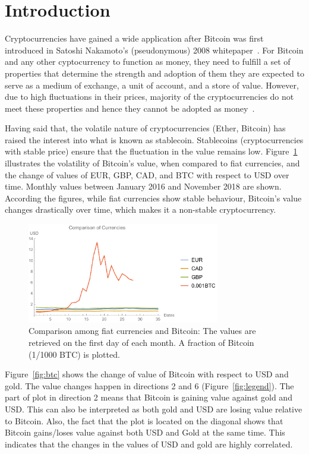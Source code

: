 \section{Introduction}\label{Intro}
Cryptocurrencies have gained a wide application after Bitcoin was first introduced in Satoshi Nakamoto’s (pseudonymous) 2008 whitepaper~\cite{nakamoto2008bitcoin}. For Bitcoin and any other cyptocurrency to function as money, they need to fulfill a set of properties that determine the strength and adoption of them \ie they are expected to serve as a medium of exchange, a unit of account, and a store of value. However, due to high fluctuations in their prices, majority of the cryptocurrencies do not meet these properties and hence they cannot be adopted as money~\cite{overview}.

Having said that, the volatile nature of cryptocurrencies (\eg Ether, Bitcoin) has raised the interest into what is known as stablecoin. Stablecoins (\ie cryptocurrencies with stable price) ensure that the fluctuation in the value remains low. Figure~\ref{fig:btcandfiat} illustrates the volatility of Bitcoin's value, when compared to fiat currencies, and the change of values of EUR, GBP, CAD, and BTC with respect to USD over time. Monthly values between January 2016 and November 2018 are shown. According the figures, while fiat currencies show stable behaviour, Bitcoin's value changes drastically over time, which makes it a non-stable cryptocurrency.

\begin{figure}[!htb]
	\centering
	\includegraphics[width=0.75\textwidth]{figures/graph1.pdf}
	\caption{\label{fig:btcandfiat}Comparison among fiat currencies and Bitcoin: The values are retrieved on the first day of each month. A fraction of Bitcoin (1/1000 BTC) is plotted.}
\end{figure}

Figure~\ref{fig:btc} shows the change of value of Bitcoin with respect to USD and gold. The value changes happen in directions 2 and 6 (Figure~\ref{fig:legend}). The part of plot in direction 2 means that Bitcoin is gaining value against gold and USD. This can also be interpreted as both gold and USD are losing value relative to Bitcoin. %
Also, the fact that the plot is located on the diagonal shows that Bitcoin gains/loses value against both USD and Gold at the same time. This indicates that the changes in the values of USD and gold are highly correlated.

